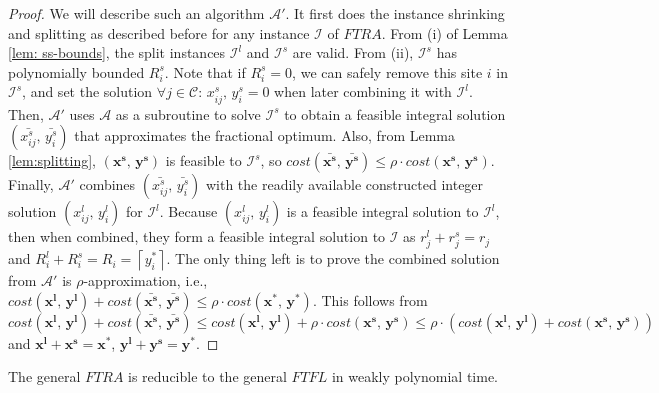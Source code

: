 \documentclass[10pt]{llncs}
\begin{document}
\begin{proof}
We will describe such an algorithm $\mathcal{A}'$. It first does
the instance shrinking and splitting as described before for any instance
$\mathcal{I}$ of $FTRA$. From (i) of Lemma \ref{lem: ss-bounds},
the split instances $\mathcal{I}^{l}$ and $\mathcal{I}^{s}$ are
valid. From (ii), $\mathcal{I}^{s}$ has polynomially bounded $R_{i}^{s}$.
Note that if $R_{i}^{s}=0$, we can safely remove this site $i$ in
$\mathcal{I}^{s}$, and set the solution $\forall j\in\mathcal{C}:\, x_{ij}^{s},\, y_{i}^{s}=0$
when later combining it with $\mathcal{I}^{l}$. Then, $\mathcal{A}'$
uses $\mathcal{A}$ as a subroutine to solve $\mathcal{I}^{s}$ to
obtain a feasible integral solution $\left(\bar{x_{ij}^{s}},\,\bar{y_{i}^{s}}\right)$
that approximates the fractional optimum. Also, from Lemma \ref{lem:splitting},
$\left(\boldsymbol{x^{s}},\,\boldsymbol{y^{s}}\right)$ is feasible
to $\mathcal{I}^{s}$, so $cost\left(\boldsymbol{\bar{x^{s}}},\,\boldsymbol{\bar{y^{s}}}\right)\leq\rho\cdot cost\left(\boldsymbol{x^{s}},\,\boldsymbol{y^{s}}\right)$.
Finally, $\mathcal{A}'$ combines $\left(\bar{x_{ij}^{s}},\,\bar{y_{i}^{s}}\right)$
with the readily available constructed integer solution $\left(x_{ij}^{l},\, y_{i}^{l}\right)$
for $\mathcal{I}^{l}$. Because $\left(x_{ij}^{l},\, y_{i}^{l}\right)$
is a feasible integral solution to $\mathcal{I}^{l}$, then when combined,
they form a feasible integral solution to $\mathcal{I}$ as $r_{j}^{l}+r_{j}^{s}=r_{j}$
and $R_{i}^{l}+R_{i}^{s}=R_{i}=\left\lceil y_{i}^{*}\right\rceil $.
The only thing left is to prove the combined solution from $\mathcal{A}'$
is $\rho$-approximation, i.e., $cost\left(\boldsymbol{x^{l}},\,\boldsymbol{y^{l}}\right)+cost\left(\boldsymbol{\bar{x^{s}}},\,\boldsymbol{\bar{y^{s}}}\right)\leq\rho\cdot cost\left(\boldsymbol{x^{*}},\,\boldsymbol{y^{*}}\right)$.
This follows from $cost\left(\boldsymbol{x^{l}},\,\boldsymbol{y^{l}}\right)+cost\left(\boldsymbol{\bar{x^{s}}},\,\boldsymbol{\bar{y^{s}}}\right)\leq cost\left(\boldsymbol{x^{l}},\,\boldsymbol{y^{l}}\right)+\rho\cdot cost\left(\boldsymbol{x^{s}},\,\boldsymbol{y^{s}}\right)\leq\rho\cdot\left(cost\left(\boldsymbol{x^{l}},\,\boldsymbol{y^{l}}\right)+cost\left(\boldsymbol{x^{s}},\,\boldsymbol{y^{s}}\right)\right)$
and $\boldsymbol{x^{l}}+\boldsymbol{x^{s}}=\boldsymbol{x^{*}}$, $\boldsymbol{y^{l}}+\boldsymbol{y^{s}}=\boldsymbol{y^{*}}$.\end{proof}
\begin{corollary}
The general $FTRA$ is reducible to the general $FTFL$ in weakly
polynomial time.\end{corollary}
\end{document}
